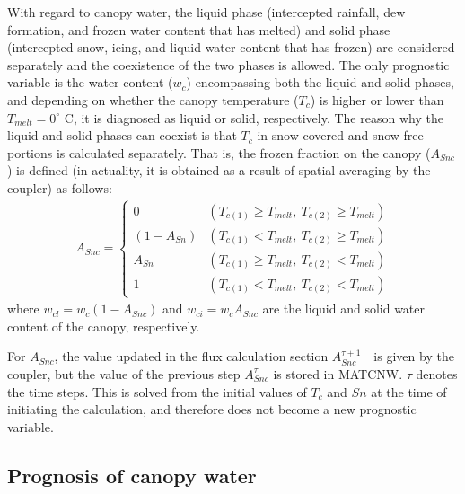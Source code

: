 With regard to canopy water, the liquid phase (intercepted rainfall, dew formation, and frozen water content that has melted) and solid phase (intercepted snow, icing, and liquid water content that
has frozen) are considered separately and the coexistence of the two phases is allowed. The only prognostic variable is the water content (\(w_c\)) encompassing both the liquid and solid phases, and
depending on whether the canopy temperature (\(T_c\)) is higher or lower than \(T_{melt} = 0^{\circ}\) C, it is diagnosed as liquid or solid, respectively. The reason why the liquid and solid phases
can coexist is that \(T_c\) in snow-covered and snow-free portions is calculated separately. That is, the frozen fraction on the canopy (\(A_{Snc}\)) is defined (in actuality, it is obtained as a
result of spatial averaging by the coupler) as follows: \begin{eqnarray}
 A_{Snc} = \left\{
\begin{array}{ll}
 0 & (T_{c(1)} \geq T_{melt}, \ T_{c(2)} \geq T_{melt})\\
 (1-A_{Sn}) & (T_{c(1)} < T_{melt}, \ T_{c(2)} \geq T_{melt})\\
 A_{Sn} & (T_{c(1)} \geq T_{melt}, \ T_{c(2)} < T_{melt})\\
 1 & (T_{c(1)} < T_{melt}, \ T_{c(2)} < T_{melt})
\end{array}
\right.
\end{eqnarray} where \(w_{cl} = w_c ( 1 - A_{Snc})\) and \(w_{ci} = w_c A_{Snc}\) are the liquid and solid water content of the canopy, respectively.

For \(A_{Snc}\), the value updated in the flux calculation section \(A_{Snc}^{\tau+1}\)　is given by the coupler, but the value of the previous step \(A_{Snc}^{\tau}\) is stored in MATCNW. \(\tau\)
denotes the time steps. This is solved from the initial values of \(T_c\) and \(Sn\) at the time of initiating the calculation, and therefore does not become a new prognostic variable.

\subsection{Prognosis of canopy water}\label{prognosis-of-canopy-water}

